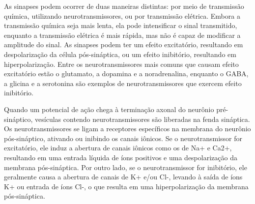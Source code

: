 
As sinapses podem ocorrer de duas maneiras distintas: por meio de transmissão química, utilizando neurotransmissores, ou por
transmissão elétrica. Embora a transmissão química seja mais lenta, ela pode intensificar o sinal transmitido, enquanto a
transmissão elétrica é mais rápida, mas não é capaz de modificar a amplitude do sinal. As sinapses podem ter um efeito
excitatório, resultando em despolarização da célula pós-sináptica, ou um efeito inibitório, resultando em hiperpolarização. Entre
os neurotransmissores mais comuns que causam efeito excitatório estão o glutamato, a dopamina e a noradrenalina, enquanto o GABA,
a glicina e a serotonina são exemplos de neurotransmissores que exercem efeito inibitório.

Quando um potencial de ação chega à terminação axonal do neurônio pré-sináptico, vesículas contendo neurotransmissores são
liberadas na fenda sináptica. Os neurotransmissores se ligam a receptores específicos na membrana do neurônio pós-sináptico,
ativando ou inibindo os canais iônicos. Se o neurotransmissor for excitatório, ele induz a abertura de canais iônicos como os de
Na+ e Ca2+, resultando em uma entrada líquida de íons positivos e uma despolarização da membrana pós-sináptica. Por outro lado, se
o neurotransmissor for inibitório, ele geralmente causa a abertura de canais de K+ e/ou Cl-, levando à saída de íons K+ ou entrada
de íons Cl-, o que resulta em uma hiperpolarização da membrana pós-sináptica.